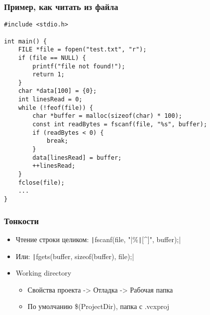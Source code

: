 \documentclass{../../slides-style}
\begin{document}
    \begin{frame}[fragile]
        \frametitle{Пример, как читать из файла}
        \begin{scriptsize}
            \begin{verbatim}
#include <stdio.h>

int main() {
    FILE *file = fopen("test.txt", "r");
    if (file == NULL) {
        printf("file not found!");
        return 1;
    }
    char *data[100] = {0};
    int linesRead = 0;
    while (!feof(file)) {
        char *buffer = malloc(sizeof(char) * 100);
        const int readBytes = fscanf(file, "%s", buffer);
        if (readBytes < 0) {
            break;
        }
        data[linesRead] = buffer;
        ++linesRead;
    }
    fclose(file);
    ...
}

            \end{verbatim}
        \end{scriptsize}
    \end{frame}

    \begin{frame}
        \frametitle{Тонкости}
        \begin{itemize}
            \item Чтение строки целиком: \texttt|fscanf(file, "|\%\texttt|[^\n]", buffer);|
            \item Или: \texttt|fgets(buffer, sizeof(buffer), file);|
            \item Working directory
            \begin{itemize}
                \item Свойства проекта -> Отладка -> Рабочая папка
                \item По умолчанию \$(ProjectDir), папка с .vcxproj
            \end{itemize}
        \end{itemize}
    \end{frame}
\end{document}
